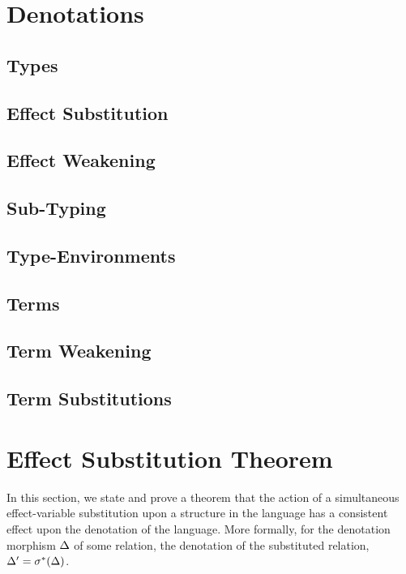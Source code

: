\documentclass{report}
\begin{document}
\chapter{Denotations}
\effectDenotations

\section{Types}
\typeDenotations

\section{Effect Substitution}
\effectSubstitutionDenotations

\section{Effect Weakening}
\effectWeakeningDenotations

\section{Sub-Typing}
\subtypingDenotations

\section{Type-Environments}
\typeEnvDenotations{\ciw}

\section{Terms}
\termDenotations{\ciw}


\section{Term Weakening}
\termWeakeningDenotations{\ciw}

\section{Term Substitutions}
\termWeakeningDenotations{\ciw}

\chapter{Effect Substitution Theorem}
In this section, we state and prove a theorem that the action of a simultaneous effect-variable substitution upon a structure in the language has a consistent effect upon the denotation of the language. More formally, for the denotation morphism $\Delta$ of some relation, the denotation of the substituted relation, $\Delta' = \sigma^*(\Delta)$.
\end{document}
